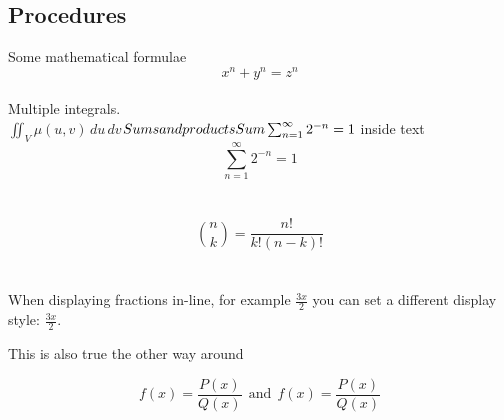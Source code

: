 \subsection{Procedures} 
Some mathematical formulae
\\
\[ x^n + y^n = z^n \]
\\
Multiple integrals.
\\
$\iint_V \mu(u,v) \,du\,dv$$
\\
\\
Sums and products
\\
Sum \sum_{n=1}^{\infty} 2^{-n} = 1$ inside text
\\
$$\sum_{n=1}^{\infty} 2^{-n} = 1$$
\\
\\
\[
    \binom{n}{k} = \frac{n!}{k!(n-k)!}
\]
\\
\\
When displaying fractions in-line, for example \(\frac{3x}{2}\) 
you can set a different display style: 
\( \displaystyle \frac{3x}{2} \).
 
This is also true the other way around
 
\[ f(x)=\frac{P(x)}{Q(x)} \ \ \textrm{and} 
\ \ f(x)=\textstyle\frac{P(x)}{Q(x)} \]






\pagebreak